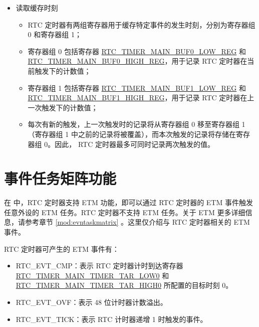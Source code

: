 \documentclass[main\_\_CN.tex]{subfiles}
\begin{document}
\begin{itemize}
    \item 读取缓存时刻
    \begin{itemize}
        \item RTC 定时器有两组寄存器用于缓存特定事件的发生时刻，分别为寄存器组 0 和寄存器组 1；
        \item 寄存器组 0 包括寄存器 \hyperref[regdesc:RTCTIMERMAINBUF0LOWREG]{RTC\_TIMER\_MAIN\_BUF0\_LOW\_REG} 和 \hyperref[regdesc:RTCTIMERMAINBUF0LOWREG]{RTC\_TIMER\_MAIN\_BUF0\_HIGH\_REG}，用于记录 RTC 定时器在当前触发下的计数值；
        \item 寄存器组 1 包括寄存器 \hyperref[regdesc:RTCTIMERMAINBUF1LOWREG]{RTC\_TIMER\_MAIN\_BUF1\_LOW\_REG} 和 \hyperref[regdesc:RTCTIMERMAINBUF1HIGHREG]{RTC\_TIMER\_MAIN\_BUF1\_HIGH\_REG}，用于记录 RTC 定时器在上一次触发下的计数值；
        \item 每次有新的触发，上一次触发时的记录将从寄存器组 0 移至寄存器组 1（寄存器组 1 中之前的记录将被覆盖），而本次触发的记录将存储在寄存器组 0。因此， RTC 定时器最多可同时记录两次触发的值。
    \end{itemize}
\end{itemize}




\section{事件任务矩阵功能}
\label{sec:rtctimer-etm-func}

在 \chipname{} 中，RTC 定时器支持 ETM 功能，即可以通过 RTC 定时器的 ETM 事件触发任意外设的 ETM 任务。RTC 定时器不支持 ETM 任务。关于 ETM 更多详细信息，请参考章节 \ref{mod:evntaskmatrix} 。这里仅介绍与 RTC 定时器相关的 ETM 事件。

RTC 定时器可产生的 ETM 事件有：

\begin{itemize}
    \item RTC\_EVT\_CMP：表示 RTC 定时器计时到达寄存器 \hyperref[fielddesc:RTCTIMERMAINTIMERTARLOW0]{RTC\_TIMER\_MAIN\_TIMER\_TAR\_LOW0} 和 \hyperref[fielddesc:RTCTIMERMAINTIMERTARHIGH0]{RTC\_TIMER\_MAIN\_TIMER\_TAR\_HIGH0} 所配置的目标时刻 0。
    \item RTC\_EVT\_OVF：表示 48 位计时器计数溢出。
    \item RTC\_EVT\_TICK：表示 RTC 计时器递增 1 时触发的事件。
\end{itemize}
\end{document}
